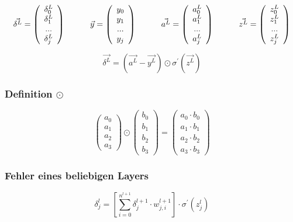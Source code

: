 \documentclass{article}
\begin{document}
\[ \vec{\delta^L} = \left( \begin{array}{c}
     \delta_0^L \\ \delta_1^L \\ ... \\ \delta_j^L 
\end{array} \right)
\kern 30pt
\vec{y} = \left( \begin{array} {c}
    y_0 \\ y_1 \\ ... \\ y_j
\end{array} \right) 
\kern 30pt
\vec{a^L} = \left(\begin{array}{c}
    a_0^L \\ a_1^L \\ ... \\ a_j^L
\end{array} \right) 
\kern 30pt
\vec{z^L} = \left(\begin{array}{c}
    z_0^L \\ z_1^L \\ ... \\ z_j^L
\end{array} \right) 
\]

\[ \vec{\delta^L} = (\vec{a^L} - \vec{y^L}) \odot \sigma^{\prime}(\vec{z^L}) \]


\subsubsection{Definition $\odot$}
\[ \left(\begin{array}{c}
    a_0 \\ a_1 \\ a_2 \\ a_3
\end{array}\right)
\odot \left(\begin{array}{c}
    b_0 \\ b_1 \\ b_2 \\ b_3
\end{array}\right) 
= \left(\begin{array}{c}
    a_0 \cdot b_0 \\ a_1 \cdot b_1 \\ a_2 \cdot b_2 \\ a_3 \cdot b_3
\end{array}\right) \]


\subsubsection{Fehler eines beliebigen Layers}
\[ \delta_j^{l} = [\sum_{i = 0}^{n^{l+1}} \delta_j^{l+1} \cdot w_{j,i}^{l+1}] \cdot \sigma^{\prime}(z_j^{l})  \]
\end{document}
